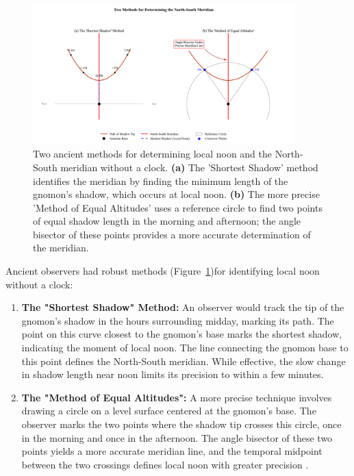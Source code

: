 \documentclass[11pt]{article}
\begin{document}
\begin{figure}[htbp]
    \centering
    \includegraphics[width=0.9\textwidth]{figures/figure_meridian_comparison_with_axis.png}
    \caption{
        Two ancient methods for determining local noon and the North-South meridian without a clock. 
        \textbf{(a)} The 'Shortest Shadow' method identifies the meridian by finding the minimum length of the gnomon's shadow, which occurs at local noon. 
        \textbf{(b)} The more precise 'Method of Equal Altitudes' uses a reference circle to find two points of equal shadow length in the morning and afternoon; the angle bisector of these points provides a more accurate determination of the meridian.
    }
    \label{fig:meridian_methods}
\end{figure}

Ancient observers had robust methods (Figure~\ref{fig:meridian_methods})for identifying local noon without a clock:
\begin{enumerate}
    \item  \textbf{The "Shortest Shadow" Method:} An observer would track the tip of the gnomon's shadow in the hours surrounding midday, marking its path. The point on this curve closest to the gnomon's base marks the shortest shadow, indicating the moment of local noon. The line connecting the gnomon base to this point defines the North-South meridian. While effective, the slow change in shadow length near noon limits its precision to within a few minutes.
    \item  \textbf{The "Method of Equal Altitudes":} A more precise technique involves drawing a circle on a level surface centered at the gnomon's base. The observer marks the two points where the shadow tip crosses this circle, once in the morning and once in the afternoon. The angle bisector of these two points yields a more accurate meridian line, and the temporal midpoint between the two crossings defines local noon with greater precision \cite{Neugebauer1975, Goldstein1983}.
\end{enumerate}
\end{document}
